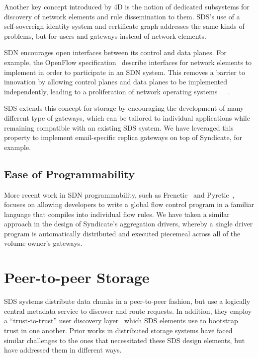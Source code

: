 Another key concept introduced by 4D is the notion of
dedicated subsystems for discovery of network elements and rule dissemination to
them.  SDS's use of a self-sovereign identity system and certificate graph
addresses the same kinds of problems, but for users and gateways instead of network
elements.

SDN encourages open interfaces between its control and data planes.
For example, the OpenFlow specification~\cite{openflow} describe interfaces for
network elements to implement in order to participate in an SDN system.
This removes a barrier to innovation by allowing control planes and data planes
to be implemented independently, leading to a proliferation of network operating
systems~\cite{ONOS}~\cite{NodeOS}~\cite{NOX}.

SDS extends this concept for
storage by encouraging the development of many different type of gateways, which
can be tailored to individual applications while remaining compatible with an
existing SDS system.  We have leveraged this property to implement email-specific replica
gateways on top of Syndicate, for example.

\subsection{Ease of Programmability}

More recent work in SDN programmability, such as Frenetic~\cite{frenetic} and
Pyretic~\cite{pyretic}, focuses on allowing developers to write a global flow
control program in a familiar language that compiles into individual flow rules.
We have taken a similar approach in the design of Syndicate's aggregation
drivers, whereby a single driver program is automatically distributed and
executed piecemeal across all of the volume owner's gateways.

\section{Peer-to-peer Storage}

SDS systems distribute data chunks in a peer-to-peer fashion, but use
a logically central metadata service to discover and route requests.  In
addition, they employ a ``trust-to-trust'' user discovery
layer~\cite{trust-to-trust principle} which SDS elements use to bootstrap trust
in one another.  Prior works in distributed storage systems have faced similar
challenges to the ones that necessitated these SDS design elements, but have
addressed them in different ways.

